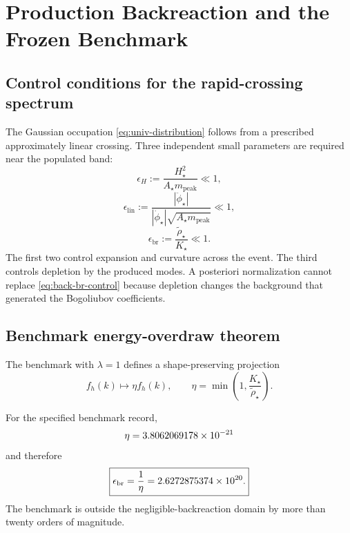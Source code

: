 \chapter{Production Backreaction and the Frozen Benchmark}
\label{ch:backreaction}

\section{Control conditions for the rapid-crossing spectrum}

The Gaussian occupation \eqref{eq:univ-distribution} follows from a prescribed approximately linear crossing.  Three independent small parameters are required near the populated band:
\begin{equation}
\epsilon_H
:=\frac{H_\star^2}{A_\star m_{\mathrm{peak}}}\ll1,
\label{eq:back-hubble-control}
\end{equation}
\begin{equation}
\epsilon_{\mathrm{lin}}
:=\frac{|\ddot\phi_\star|}
{|\dot\phi_\star|\sqrt{A_\star m_{\mathrm{peak}}}}\ll1,
\label{eq:back-linear-control}
\end{equation}
\begin{equation}
\epsilon_{\mathrm{br}}
:=\frac{\widetilde\rho_\star}{K_\star}\ll1.
\label{eq:back-br-control}
\end{equation}
The first two control expansion and curvature across the event.  The third controls depletion by the produced modes.  A posteriori normalization cannot replace \eqref{eq:back-br-control} because depletion changes the background that generated the Bogoliubov coefficients.

\section{Benchmark energy-overdraw theorem}

The benchmark with $\lambda=1$ defines a shape-preserving projection
\begin{equation}
f_h(k)\longmapsto\eta f_h(k),
\qquad
\eta=\min\left(1,\frac{K_\star}{\widetilde\rho_\star}\right).
\label{eq:back-projection}
\end{equation}

\begin{theorem}
For the specified benchmark record,
\begin{equation}
\eta=3.8062069178\times 10^{-21}
\end{equation}
and therefore
\begin{equation}
\boxed{
\epsilon_{\mathrm{br}}
=\frac1\eta
=2.6272875374\times 10^{20}.}
\label{eq:back-overdraw}
\end{equation}
The benchmark is outside the negligible-backreaction domain by more than twenty orders of magnitude.
\end{theorem}

